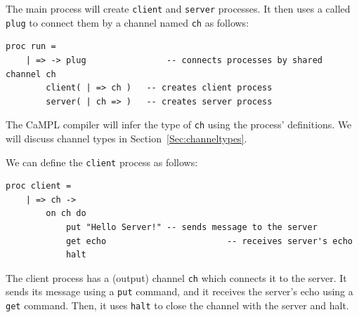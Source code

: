 \documentclass[11pt]{article}
\begin{document}

The main process will create \lstinline$client$ and \lstinline$server$ processes. It then uses a  called \lstinline$plug$ to connect them by a channel named \lstinline$ch$ as follows:
\begin{lstlisting}[label=ex:serverecho, caption=Server echos Client's message]
 proc run = 
 	| => -> plug				-- connects processes by shared channel ch
 		client( | => ch )	-- creates client process
 		server( | ch => )	-- creates server process
\end{lstlisting}
The CaMPL compiler will infer the type of \lstinline$ch$ using the process' definitions. We will discuss channel types in Section~\ref{Sec:channeltypes}.%

We can define the  \lstinline$client$ process as follows:
\begin{lstlisting}
proc client = 
	| => ch ->
		on ch do 
			put "Hello Server!"	-- sends message to the server      
			get echo						-- receives server's echo  
			halt
\end{lstlisting}
The client process has a (output) channel \lstinline$ch$ which connects it to the server.
It sends its message using a \lstinline$put$ command, and it receives the server's echo using a \lstinline$get$ command.
Then, it uses \lstinline$halt$ to close the channel with the server and halt.
\end{document}
